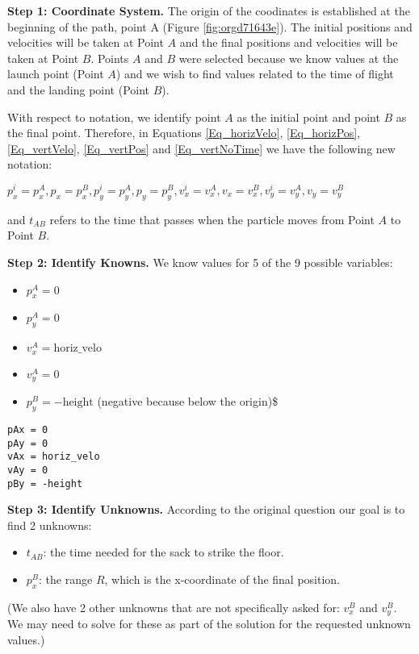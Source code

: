 \documentclass[11pt]{article}
\begin{document}
\textbf{Step 1: Coordinate System.} The origin of the coodinates is
established at the beginning of the path, point A (Figure
\ref{fig:orgd71643e}).  The initial positions and velocities will be taken
at Point \(A\) and the final positions and velocities will be taken at
Point \(B\).  Points \(A\) and \(B\) were selected because we know values at
the launch point (Point \(A\)) and we wish to find values related to the
time of flight and the landing point (Point \(B\)).

With respect to notation, we identify point \(A\) as the initial point
and point \(B\) as the final point.  Therefore, in Equations
\ref{Eq_horizVelo},
\ref{Eq_horizPos},
\ref{Eq_vertVelo}, \ref{Eq_vertPos}
and \ref{Eq_vertNoTime} we have the following new
notation:

\(p^i_x = p^A_x, p_x = p^B_x, p^i_y = p^A_y, p_y = p^B_y, v^i_x = v^A_x, v_x = v^B_x, v^i_y = v^A_y, v_y = v^B_y\)

and \(t_{AB}\) refers to the time that passes when the particle moves from Point \(A\) to Point \(B\).

\textbf{Step 2: Identify Knowns.} We know values for 5 of the 9 possible
variables:

\begin{itemize}
\item \(p_x^A = 0\)
\item \(p_y^A = 0\)
\item \(v_x^A = \text{horiz_velo}\)
\item \(v_y^A = 0\)
\item \(p_y^B = -\text{height}\) (negative because below the origin)\$
\end{itemize}

\begin{verbatim}
pAx = 0
pAy = 0
vAx = horiz_velo
vAy = 0
pBy = -height
\end{verbatim}

\textbf{Step 3: Identify Unknowns.} According to the original question our goal is to find 2 unknowns:

\begin{itemize}
\item \(t_{AB}\): the time needed for the sack to strike the floor.
\item \(p_x^B\): the range \(R\), which is the x-coordinate of the final position.
\end{itemize}

(We also have 2 other unknowns that are not specifically asked for:
\(v_x^B\) and \(v_y^B\).  We may need to solve for these as part of the
solution for the requested unknown values.)
\end{document}
